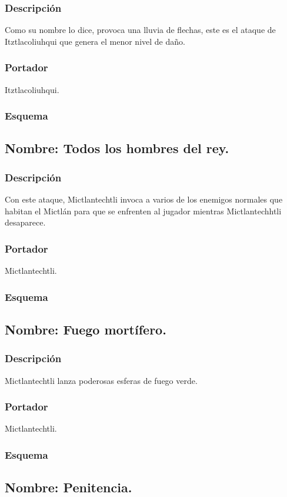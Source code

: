 \documentclass[11pt,letterpaper]{article}
\begin{document}
\subsubsection{Descripción}
Como su nombre lo dice, provoca una lluvia de flechas, este es el ataque de Itztlacoliuhqui que genera el menor nivel de daño. 
\subsubsection{Portador}
Itztlacoliuhqui.
\subsubsection{Esquema}
\subsection{Nombre: Todos los hombres del rey.}
\subsubsection{Descripción}
Con este ataque,  Mictlantechtli invoca a varios de los enemigos normales que habitan el Mictlán para que se enfrenten al jugador mientras  Mictlantechhtli desaparece.
\subsubsection{Portador}
Mictlantechtli.
\subsubsection{Esquema}
\subsection{Nombre: Fuego mortífero.}
\subsubsection{Descripción}
Mictlantechtli  lanza poderosas esferas de fuego verde.
\subsubsection{Portador}
Mictlantechtli.	
\subsubsection{Esquema}	
\subsection{Nombre: Penitencia.}
\end{document}
